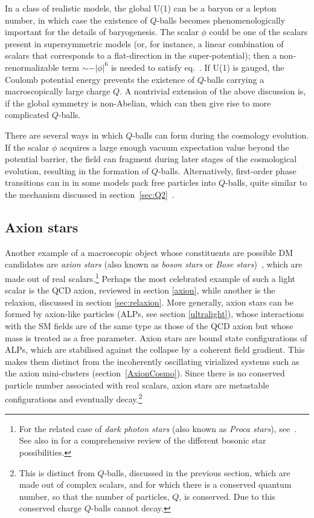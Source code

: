 \smallskip

In a class of realistic models, the global U(1) can be a baryon or a lepton number,
in which case the existence of $Q$-balls becomes phenomenologically important for the details of baryogenesis.
The scalar $\phi$ could be one of the scalars  present
in supersymmetric models (or, for instance, a linear  combination of scalars that corresponds to a flat-direction in the super-potential); 
then a non-renormalizable term $\sim - |\phi|^6$ is needed 
to satisfy eq.~\cite{Qballs}.
If U(1) is gauged, the Coulomb potential energy prevents the  existence of $Q$-balls carrying a macroscopically large charge $Q$.
A nontrivial extension of the above discussion is, if the global symmetry is non-Abelian, which can then give rise to more complicated $Q$-balls.

\smallskip


There are several ways in which $Q$-balls can form during the cosmology evolution. If the scalar $\phi$ acquires a large enough vacuum expectation value 
beyond the potential barrier, the field can fragment during later stages of the cosmological evolution, resulting in the formation of $Q$-balls.
Alternatively, first-order phase transitions  can in in some models pack free particles into $Q$-balls,
quite similar to the mechanism discussed in section~\ref{sec:Q2}~\cite{QballsBis}.


\subsection{Axion stars}\label{sec:axionstar}
Another example of a macroscopic object whose constituents are possible DM candidates are  {\em axion stars} (also known as {\em boson stars} or {\em Bose stars})~\cite{axion:stars}, which are made out of real scalars.\footnote{For the related case of {\em dark photon stars} (also known as {\em Proca stars}), see~\cite{Procastars}. 
See also  in \cite{Procastars} for a comprehensive review of the different bosonic star possibilities. } 
Perhaps the most celebrated example of such a light scalar is the QCD axion, reviewed in section \ref{axion}, while another is the relaxion, discussed in section \ref{sec:relaxion}. 
More generally, axion stars can be formed by axion-like particles (ALPs, see section \ref{ultralight}), whose interactions with the SM fields are of the same type as those of the QCD axion but whose mass is treated as a free parameter. 
Axion stars are bound state configurations of ALPs, which are stabilised against the collapse 
by a coherent field gradient. 
This makes them distinct from the incoherently oscillating virialized systems such as the axion mini-clusters (section~\ref{AxionCosmo}). 
Since there is no conserved particle number associated with real scalars, axion stars are metastable configurations and eventually decay.\footnote{This is distinct from $Q$-balls, discussed in the previous section, which are made out of complex scalars, and for which there is a conserved quantum number, so that the number of particles, $Q$, is conserved. Due to this conserved charge $Q$-balls cannot decay.} 

